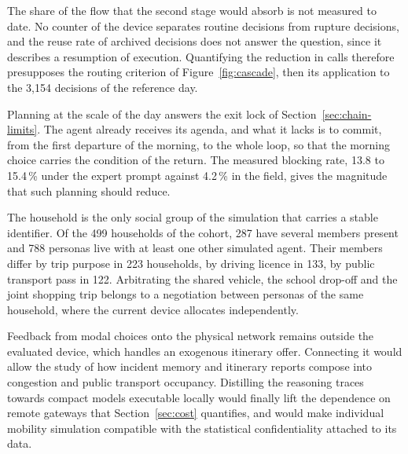 \begin{figure}[tbp]
\end{figure}

The share of the flow that the second stage would absorb is not measured to date. No counter of the device separates routine decisions from rupture decisions, and the reuse rate of archived decisions does not answer the question, since it describes a resumption of execution. Quantifying the reduction in calls therefore presupposes the routing criterion of Figure~\ref{fig:cascade}, then its application to the 3{,}154 decisions of the reference day.

Planning at the scale of the day answers the exit lock of Section~\ref{sec:chain-limits}. The agent already receives its agenda, and what it lacks is to commit, from the first departure of the morning, to the whole loop, so that the morning choice carries the condition of the return. The measured blocking rate, 13.8 to 15.4\,\% under the expert prompt against 4.2\,\% in the field, gives the magnitude that such planning should reduce.

The household is the only social group of the simulation that carries a stable identifier. Of the 499 households of the cohort, 287 have several members present and 788 personas live with at least one other simulated agent. Their members differ by trip purpose in 223 households, by driving licence in 133, by public transport pass in 122. Arbitrating the shared vehicle, the school drop-off and the joint shopping trip belongs to a negotiation between personas of the same household, where the current device allocates independently.

Feedback from modal choices onto the physical network remains outside the evaluated device, which handles an exogenous itinerary offer. Connecting it would allow the study of how incident memory and itinerary reports compose into congestion and public transport occupancy. Distilling the reasoning traces towards compact models executable locally would finally lift the dependence on remote gateways that Section~\ref{sec:cost} quantifies, and would make individual mobility simulation compatible with the statistical confidentiality attached to its data.


